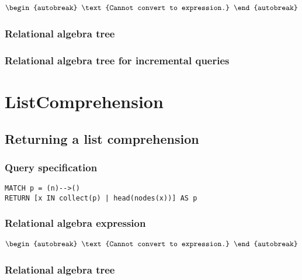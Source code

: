\begin{align*}
\begin{autobreak}
\text{Cannot convert to expression.}
\end{autobreak}
\end{align*}

\subsubsection*{Relational algebra tree}


\subsubsection*{Relational algebra tree for incremental queries}

\section{ListComprehension}


\subsection{Returning a list comprehension}

\subsubsection*{Query specification}

\begin{lstlisting}
MATCH p = (n)-->()
RETURN [x IN collect(p) | head(nodes(x))] AS p
\end{lstlisting}

\subsubsection*{Relational algebra expression}

\begin{align*}
\begin{autobreak}
\text{Cannot convert to expression.}
\end{autobreak}
\end{align*}

\subsubsection*{Relational algebra tree}

